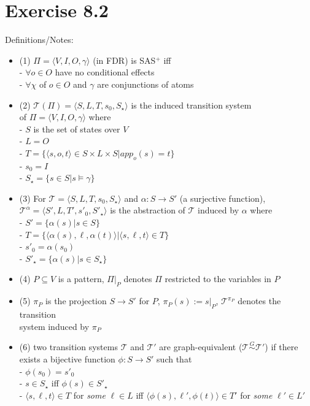 \documentclass[11pt,a4paper]{article}
\begin{document}
\section*{Exercise 8.2}
Definitions/Notes:
\begin{itemize}
\item (1) $\Pi=\langle V,I,O,\gamma\rangle$ (in FDR) is SAS$^+$ iff\\
\hphantom{tabtab}- $\forall o\in O$ have no conditional effects\\
\hphantom{tabtab}- $\forall \chi$ of $o\in O$ and $\gamma$ are conjunctions of atoms
\item (2) $\mathscr{T}(\Pi)=\langle S,L,T,s_0,S_\star\rangle$ is the induced transition system\\
of $\Pi=\langle V,I,O,\gamma\rangle$ where\\
\hphantom{tabtab}- $S$ is the set of states over $V$\\
\hphantom{tabtab}- $L=O$\\
\hphantom{tabtab}- $T=\{\langle s,o,t\rangle\in S\times L\times S|app_o(s)=t\}$\\
\hphantom{tabtab}- $s_0=I$\\
\hphantom{tabtab}- $S_\star=\{s\in S|s\models\gamma\}$
\item (3) For $\mathscr{T}=\langle S,L,T,s_0,S_\star\rangle$ and $\alpha:S\to S'$ (a surjective function),\\
$\mathscr{T}^\alpha=\langle S',L,T',s'_0,S'_\star\rangle$ is the abstraction of $\mathscr{T}$ induced by $\alpha$ where\\
\hphantom{tabtab}- $S'=\{\alpha(s)|s\in S\}$\\
\hphantom{tabtab}- $T=\{\langle \alpha(s),\ell,\alpha(t)\rangle|\langle s,\ell,t\rangle\in T\}$\\
\hphantom{tabtab}- $s'_0=\alpha(s_0)$\\
\hphantom{tabtab}- $S'_\star=\{\alpha(s)|s\in S_\star\}$
\item (4) $P\subseteq V$ is a pattern, $\Pi|_P$ denotes $\Pi$ restricted to the variables in $P$
\item (5) $\pi_P$ is the projection $S\to S'$ for $P$, $\pi_P(s):=s|_P$, $\mathscr{T}^{\pi_P}$ denotes the transition\\
system induced by $\pi_P$
\item (6) two transition systems $\mathscr{T}$ and $\mathscr{T}'$ are graph-equivalent ($\mathscr{T}\stackrel{G}{\sim}\mathscr{T}'$) if there exists a bijective function $\phi:S\to S'$ such that\\
\hphantom{tabtab}- $\phi(s_0)=s'_0$\\
\hphantom{tabtab}- $s\in S_\star$ iff $\phi(s)\in S'_\star$\\
\hphantom{tabtab}- $\langle s,\ell,t\rangle\in T$ for \emph{some} $\ell\in L$ iff $\langle\phi(s),\ell',\phi(t)\rangle\in T'$ for \emph{some} $\ell'\in L'$\\
\end{itemize}
\end{document}
